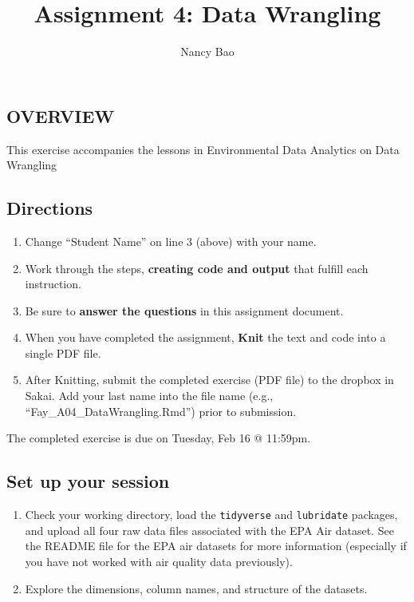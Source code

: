 \documentclass[
]{article}
\title{Assignment 4: Data Wrangling}
\author{Nancy Bao}
\date{}
\providecommand{\tightlist}{%
  \setlength{\itemsep}{0pt}\setlength{\parskip}{0pt}}
\begin{document}
\maketitle

\hypertarget{overview}{%
\subsection{OVERVIEW}\label{overview}}

This exercise accompanies the lessons in Environmental Data Analytics on
Data Wrangling

\hypertarget{directions}{%
\subsection{Directions}\label{directions}}

\begin{enumerate}
\def\labelenumi{\arabic{enumi}.}
\tightlist
\item
  Change ``Student Name'' on line 3 (above) with your name.
\item
  Work through the steps, \textbf{creating code and output} that fulfill
  each instruction.
\item
  Be sure to \textbf{answer the questions} in this assignment document.
\item
  When you have completed the assignment, \textbf{Knit} the text and
  code into a single PDF file.
\item
  After Knitting, submit the completed exercise (PDF file) to the
  dropbox in Sakai. Add your last name into the file name (e.g.,
  ``Fay\_A04\_DataWrangling.Rmd'') prior to submission.
\end{enumerate}

The completed exercise is due on Tuesday, Feb 16 @ 11:59pm.

\hypertarget{set-up-your-session}{%
\subsection{Set up your session}\label{set-up-your-session}}

\begin{enumerate}
\def\labelenumi{\arabic{enumi}.}
\item
  Check your working directory, load the \texttt{tidyverse} and
  \texttt{lubridate} packages, and upload all four raw data files
  associated with the EPA Air dataset. See the README file for the EPA
  air datasets for more information (especially if you have not worked
  with air quality data previously).
\item
  Explore the dimensions, column names, and structure of the datasets.
\end{enumerate}
\end{document}

